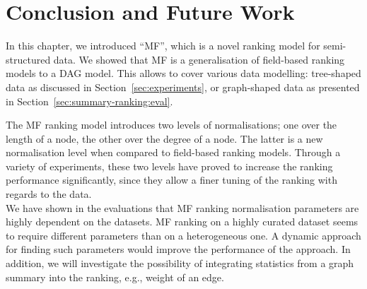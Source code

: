\section{Conclusion and Future Work}

In this chapter, we introduced ``MF'', which is a novel ranking model for semi-structured data. We showed that MF is a generalisation of field-based ranking models to a DAG model. This allows to cover various data modelling: tree-shaped data as discussed in Section~\ref{sec:experiments}, or graph-shaped data as presented in Section~\ref{sec:summary-ranking:eval}.

The MF ranking model introduces two levels of normalisations; one over the length of a node, the other over the degree of a node. The latter is a new normalisation level when compared to field-based ranking models. Through a variety of experiments, these two levels have proved to increase the ranking performance significantly, since they allow a finer tuning of the ranking with regards to the data.\\

We have shown in the evaluations that MF ranking normalisation parameters are highly dependent on the datasets. MF ranking on a highly curated dataset seems to require different parameters than on a heterogeneous one. A dynamic approach for finding such parameters would improve the performance of the approach. In addition, we will investigate the possibility of integrating statistics from a graph summary into the ranking, e.g., weight of an edge.
